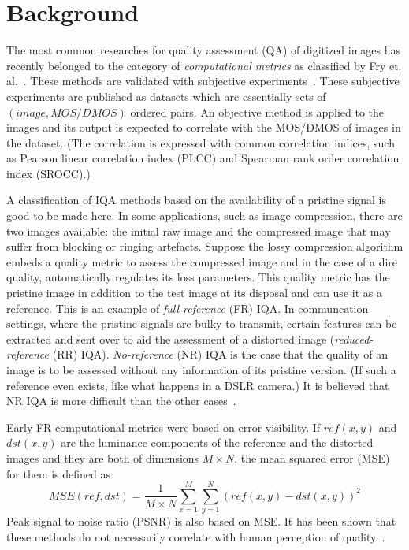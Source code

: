 \documentclass{article}
\begin{document}
\section{Background} \label{background}
The most common researches for quality assessment (QA) of digitized images has recently belonged to the category of \emph{computational metrics} as classified by Fry et. al.~\cite{fry2018bridging}. These methods are validated with subjective experiments~\cite{zhai2020perceptual}. These subjective experiments are published as datasets which are essentially sets of $(image, MOS/DMOS)$ ordered pairs. An objective method is applied to the images and its output is expected to correlate with the MOS/DMOS of images in the dataset. (The correlation is expressed with common correlation indices, such as Pearson linear correlation index (PLCC) and Spearman rank order correlation index (SROCC).)

A classification of IQA methods based on the availability of a pristine signal is good to be made here. In some applications, such as image compression, there are two images available: the initial raw image and the compressed image that may suffer from blocking or ringing artefacts. Suppose the lossy compression algorithm embeds a quality metric to assess the compressed image and in the case of a dire quality, automatically regulates its loss parameters. This quality metric has the pristine image in addition to the test image at its disposal and can use it as a reference. This is an example of \emph{full-reference} (FR) IQA. In communcation settings, where the pristine signals are bulky to transmit, certain features can be extracted and sent over to aid the assessment of a distorted image (\emph{reduced-reference} (RR) IQA). \emph{No-reference} (NR) IQA is the case that the quality of an image is to be assessed without any information of its pristine version. (If such a reference even exists, like what happens in a DSLR camera.) It is believed that NR IQA is more difficult than the other cases~\cite{kang2014convolutional}.

Early FR computational metrics were based on error visibility. If $ref(x, y)$ and $dst(x, y)$ are the luminance components of the reference and the distorted images and they are both of dimensions $M\times N$, the mean squared error (MSE) for them is defined as:
\begin{equation}
	\label{eq:mse}
	\displaystyle MSE(ref, dst) = \frac{1}{M\times N}\sum_{x=1}^M \sum_{y = 1}^N \left(ref(x, y)-dst(x, y)\right)^2
\end{equation}
Peak signal to noise ratio (PSNR) is also based on MSE. It has been shown that these methods do not necessarily correlate with human perception of quality~\cite{wang2009mean}.
\end{document}
